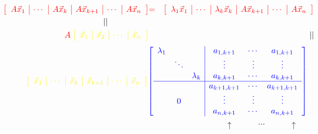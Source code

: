 \documentclass[pdf,9pt]{beamer}
\begin{document}
\begin{frame}[fragile]
   \begin{proofnoend}
    \footnotesize
    \begin{eqnarray*}
	\hspace{-2em}
	\textcolor{red}{\left[ \begin{array}{c|c|c|c|c|c} A\vec{x}_1 & \cdots& A\vec{x}_k &A\vec{x}_{k+1} & \cdots & A\vec{x}_n \end{array} \right]} & \textcolor{red}{=} &
	\textcolor{red}{\left[ \begin{array}{c|c|c|c|c|c}
	\lambda_1\vec{x}_1 &
	\cdots &
	\lambda_k\vec{x}_k &
	A\vec{x}_{k+1} &
	\cdots &
	A\vec{x}_n \end{array} \right]} \\
	||\hspace{ 5em } 		 &&\\
	\textcolor{red}{A} \: \textcolor{yellow}{\left[ \begin{array}{c|c|c|c} \vec{x}_1 &  \vec{x}_2  & \cdots &  \vec{x}_n \end{array} \right]}
	&  & \hspace{4em}||
    \end{eqnarray*}
    \pause
    \begin{align*}
	\textcolor{yellow}{\left[ \begin{array}{c|c|c|c|c|c} \vec{x}_1 &  \cdots  & \vec{x}_k & \vec{x}_{k+1}&\cdots&  \vec{x}_n \end{array} \right]}
	\textcolor{blue}{\left[ \begin{array}{ccc|ccc}
	    \lambda_1 &        &           & a_{1,k+1}   & \cdots &  a_{1,k+1}   \\
                      & \ddots &           & \vdots      & \vdots &  \vdots      \\
                      &        & \lambda_k & a_{k,k+1}   & \cdots &  a_{k,k+1}   \\ \hline
                      &        &           & a_{k+1,k+1} & \cdots &  a_{k+1,k+1} \\
                      & 0      &           & \vdots      & \vdots &  \vdots      \\
                      &        &           & a_{n,k+1}   & \cdots &  a_{n,k+1}
    \end{array}
	  \right]}
    \end{align*}
    \pause
    \[
	\hspace{23em}\uparrow\hspace{3em}\cdots\hspace{3em}\uparrow
\]
\end{proofnoend}
\end{frame}
\end{document}
